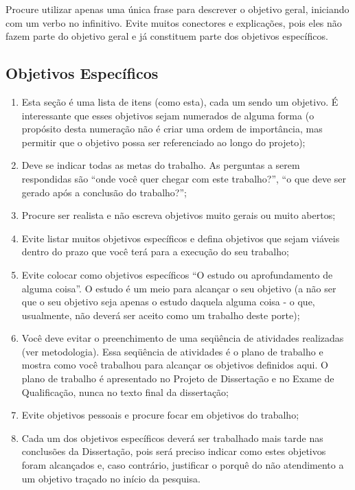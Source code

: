 Procure utilizar apenas uma única frase para descrever o objetivo geral, iniciando com um verbo no infinitivo. Evite muitos conectores e explicações, pois eles não fazem parte do objetivo geral e já constituem parte dos objetivos específicos.




\subsection{Objetivos Específicos}
\label{ss_cintro_objetivos_espec}

\begin{enumerate}
    \item Esta seção é uma lista de itens (como esta), cada um sendo um objetivo. É interessante que esses objetivos sejam numerados de alguma forma (o propósito desta numeração não é criar uma ordem de importância, mas permitir que o objetivo possa ser referenciado ao longo do projeto);
    
    \item Deve se indicar todas as metas do trabalho. As perguntas a serem respondidas são “onde você quer chegar com este trabalho?”, “o que deve ser gerado após a conclusão do trabalho?”;
    
    \item Procure ser realista e não escreva objetivos muito gerais ou muito abertos;
    
    \item Evite listar muitos objetivos específicos e defina objetivos que sejam viáveis dentro do prazo que você terá para a execução do seu trabalho;
    
    \item Evite colocar como objetivos específicos “O estudo ou aprofundamento de alguma coisa”. O estudo é um meio para alcançar o seu objetivo (a não ser que o seu objetivo seja apenas o estudo daquela alguma coisa - o que, usualmente, não deverá ser aceito como um trabalho deste porte);
    
    \item Você deve evitar o preenchimento de uma seqüência de atividades realizadas (ver metodologia). Essa seqüência de atividades é o plano de trabalho e mostra como você trabalhou para alcançar os objetivos definidos aqui. O plano de trabalho é apresentado no Projeto de Dissertação e no Exame de Qualificação, nunca no texto final da dissertação;
    
    \item Evite objetivos pessoais e procure focar em objetivos do trabalho;
    
    \item Cada um dos objetivos específicos deverá ser trabalhado mais tarde nas conclusões da Dissertação, pois será preciso indicar como estes objetivos foram alcançados e, caso contrário, justificar o porquê do não atendimento a um objetivo traçado no início da pesquisa.    
\end{enumerate}



